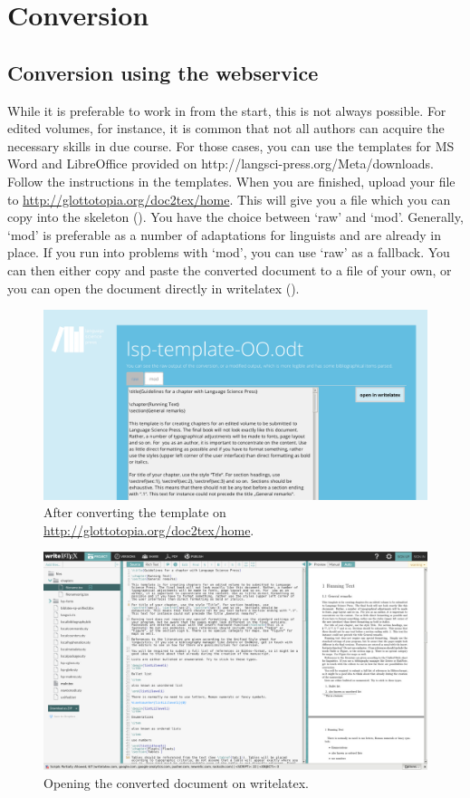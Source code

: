 \chapter{Conversion} 
\section{Conversion using the webservice}
While it is preferable to work in \latex from the start, this is not always possible. For edited volumes, for instance, it is common that not all authors can acquire the necessary skills in due course. For those cases, you can use the templates for MS Word and LibreOffice provided on http://langsci-press.org/Meta/downloads. Follow the instructions in the templates. When you are finished, upload your file to \url{http://glottotopia.org/doc2tex/home}. This will give you a file which you can copy into the skeleton (). You have the choice between `raw' and `mod'. Generally, `mod' is preferable as a number of adaptations for linguists and \lsp are already in place. If you run into problems with `mod', you can use `raw' as a fallback. You can then either copy and paste the converted document to a file of your own, or you can open the document directly in writelatex ().

\begin{figure}
\includegraphics[width=\textwidth]{converter.png} 
\caption{After converting the template on \url{http://glottotopia.org/doc2tex/home}.}
\label{fig:conversion:glottotopia}
\end{figure}

\begin{figure}
\includegraphics[width=\textwidth]{conversionwritelatex.png} 
\caption{Opening the converted document on writelatex.}
\label{fig:conversion:glottotopia}
\end{figure}

